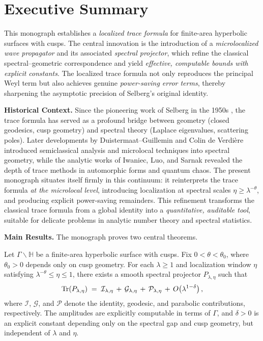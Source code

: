 
\section{Executive Summary}

This monograph establishes a \emph{localized trace formula} for finite-area
hyperbolic surfaces with cusps. The central innovation is the introduction of a
\emph{microlocalized wave propagator} and its associated \emph{spectral
projector}, which refine the classical spectral–geometric correspondence and
yield \emph{effective, computable bounds with explicit constants}. The localized
trace formula not only reproduces the principal Weyl term but also achieves
genuine \emph{power-saving error terms}, thereby sharpening the asymptotic
precision of Selberg’s original identity.

\medskip
\noindent\textbf{Historical Context.}
Since the pioneering work of Selberg in the 1950s \cite{Selberg1956}, the trace
formula has served as a profound bridge between geometry (closed geodesics,
cusp geometry) and spectral theory (Laplace eigenvalues, scattering poles).
Later developments by Duistermaat–Guillemin \cite{DG1975} and Colin de
Verdière \cite{CdV1980} introduced semiclassical analysis and microlocal
techniques into spectral geometry, while the analytic works of Iwaniec, Luo,
and Sarnak \cite{IwaniecSarnak1995, LuoSarnak1995} revealed the depth of trace
methods in automorphic forms and quantum chaos. The present monograph
situates itself firmly in this continuum: it reinterprets the trace formula
\emph{at the microlocal level}, introducing localization at spectral scales
$\eta \geq \lambda^{-\theta}$, and producing explicit power-saving remainders.
This refinement transforms the classical trace formula from a global identity
into a \emph{quantitative, auditable tool}, suitable for delicate problems in
analytic number theory and spectral statistics.

\medskip
\noindent\textbf{Main Results.}
The monograph proves two central theorems.

\begin{theorem}\label{thm:localized-trace}
Let $\Gamma \backslash \mathbb{H}$ be a finite-area hyperbolic surface with
cusps. Fix $0<\theta<\theta_0$, where $\theta_0>0$ depends only on cusp
geometry. For each $\lambda \geq 1$ and localization window $\eta$ satisfying
$\lambda^{-\theta} \leq \eta \leq 1$, there exists a smooth spectral projector
$P_{\lambda,\eta}$ such that
\[
  \operatorname{Tr}(P_{\lambda,\eta})
  \;=\;
  \mathcal{I}_{\lambda,\eta}
  \,+\,
  \mathcal{G}_{\lambda,\eta}
  \,+\,
  \mathcal{P}_{\lambda,\eta}
  \,+\,
  O\!\left(\lambda^{1-\delta}\right),
\]
where $\mathcal{I}$, $\mathcal{G}$, and $\mathcal{P}$ denote the identity,
geodesic, and parabolic contributions, respectively. The amplitudes are
explicitly computable in terms of $\Gamma$, and $\delta>0$ is an explicit
constant depending only on the spectral gap and cusp geometry, but independent
of $\lambda$ and $\eta$.
\end{theorem}

